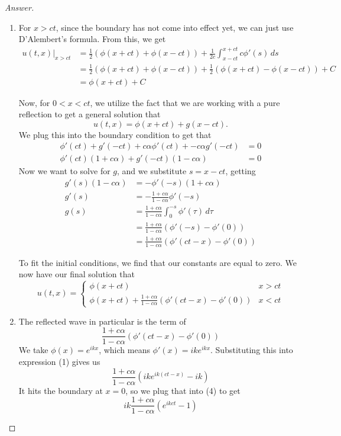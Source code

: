 \documentclass{article}
\theoremstyle{definition}
\renewcommand\qedsymbol{$\blacksquare$}
\newenvironment{ans}{\begin{proof}[Answer]\renewcommand{\qedsymbol}{}}{\end{proof}}
\begin{document}
\begin{ans}
\begin{enumerate}
    \item For $x > ct$, since the boundary has not come into effect yet, we can just use D'Alembert's formula. From this, we get
    \begin{align*}
        u(t,x)|_{x > ct} &= \frac{1}{2}(\phi(x+ct) + \phi(x-ct)) + \frac{1}{2c}\int_{x-ct}^{x+ct}c\phi'(s)\,ds\\
        &= \frac{1}{2}(\phi(x+ct) + \phi(x-ct)) + \frac{1}{2}(\phi(x+ct) - \phi(x-ct)) + C\\
        &= \phi(x+ct) + C
    \end{align*}

    Now, for $0 < x < ct$, we utilize the fact that we are working with a pure reflection to get a general solution that
    \[u(t,x) = \phi(x+ct) + g(x-ct).\]
    We plug this into the boundary condition to get that
    \begin{align*}
        \phi'(ct) + g'(-ct) + c\alpha \phi'(ct) + -c\alpha g'(-ct) &= 0\\
        \phi'(ct)(1 + c\alpha) + g'(-ct)(1 - c\alpha) &= 0
    \end{align*}
    Now we want to solve for $g$, and we substitute $s = x-ct$, getting
    \begin{align*}
        g'(s)(1-c\alpha) &= -\phi'(-s)(1+c\alpha)\\
        g'(s) &= -\frac{1+c\alpha}{1-c\alpha}\phi'(-
        s)\\
        g(s) &= \frac{1+c\alpha}{1-c\alpha}\int_0^{-s}\phi'(\tau)\,d\tau \tag{taking $\tau = -s$}\\
        &=\frac{1+c\alpha}{1-c\alpha}(\phi'(-s) - \phi'(0))\\
        &=\frac{1+c\alpha}{1-c\alpha}(\phi'(ct-x) - \phi'(0))
    \end{align*}

    To fit the initial conditions, we find that our constants are equal to zero. We now have our final solution that
    \[\boxed{u(t,x) = \begin{cases}
        \phi(x+ct) & x > ct\\
        \phi(x+ct) + \frac{1+c\alpha}{1-c\alpha}(\phi'(ct-x) - \phi'(0)) & x < ct
    \end{cases}}\]


\item The reflected wave in particular is the term of 
    \begin{equation*}
        \frac{1+c\alpha}{1-c\alpha}(\phi'(ct-x) - \phi'(0))
    \end{equation*}
    We take $\phi(x) = e^{ikx}$, which means $\phi'(x) = ike^{ikx}$. Substituting this into expression (1) gives us
    \begin{equation*}
        \frac{1+c\alpha}{1-c\alpha}(ike^{ik(ct-x)} - ik) \tag{4}
    \end{equation*}
    It hits the boundary at $x=0$, so we plug that into (4) to get
    \begin{equation*}
        ik\frac{1+c\alpha}{1-c\alpha}(e^{ikct} - 1)
    \end{equation*}


\end{enumerate}
\end{ans}
\end{document}
